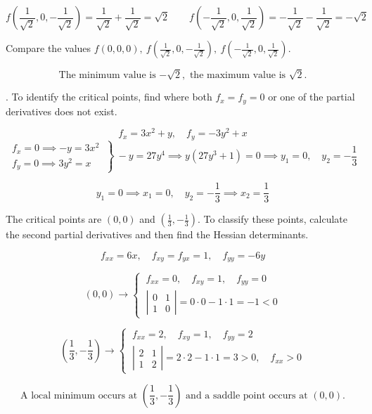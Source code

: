 \documentclass{article}
\begin{document}
\hfill

\[f\left(\frac1{\sqrt2},0,-\frac1{\sqrt2}\right)=\frac1{\sqrt2}+\frac1{\sqrt2}=\sqrt2\qquad f\left(-\frac1{\sqrt2},0,\frac1{\sqrt2}\right)=-\frac1{\sqrt2}-\frac1{\sqrt2}=-\sqrt2\]

\hfill

\noindent Compare the values $\displaystyle f(0,0,0),\:f\left(\frac1{\sqrt2},0,-\frac1{\sqrt2}\right),\:f\left(-\frac1{\sqrt2},0,\frac1{\sqrt2}\right)$.

\hfill

\[\boxed{\text{The minimum value is }{-\sqrt2},\text{ the maximum value is }\sqrt2.}\]

\hfill

.  To identify the critical points, find where both $f_x=f_y=0$ or one of the partial derivatives does not exist.

\[f_x=3x^2+y,\quad f_y=-3y^2+x\]
\[\left.\begin{array}{c}
f_x=0\implies-y=3x^2\\
f_y=0\implies3y^2=x 
\end{array}\:\right\}\:-y=27y^4\implies y(27y^3+1)=0\implies y_1=0,\quad y_2=-\frac13\]

\[y_1=0\implies x_1=0,\quad y_2=-\frac13\implies x_2=\frac13\]

\hfill

\noindent The critical points are $(0,0)$ and $\left(\frac13,-\frac13\right)$. To classify these points, calculate the second partial derivatives and then find the Hessian determinants.

\[f_{xx}=6x,\quad f_{xy}=f_{yx}=1,\quad f_{yy}=-6y\]

\[(0,0)\rightarrow\left\{\:\begin{array}{l}
f_{xx}=0,\quad f_{xy}=1,\quad f_{yy}=0\\[1em]
\left|\begin{array}{cc}
0 & 1\\
1 & 0
\end{array}\right|=0\cdot0-1\cdot1=-1<0
\end{array}\right.\]

\[\left(\frac13,-\frac13\right)\rightarrow\left\{\:\begin{array}{l}
f_{xx}=2,\quad f_{xy}=1,\quad f_{yy}=2\\[1em]
\left|\begin{array}{cc}
2 & 1\\
1 & 2
\end{array}\right|=2\cdot2-1\cdot1=3>0,\quad f_{xx}>0
\end{array}\right.\]

\[\boxed{\text{A local minimum occurs at }\left(\frac13,-\frac13\right)\text{ and a saddle point occurs at }(0,0).}\]
\end{document}
